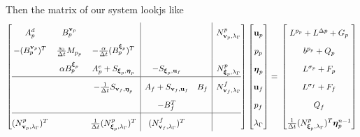\documentclass{article}
\newcommand{\mathspace}[1]{\ensuremath{#1}\xspace} %
\newcommand{\dt}{\mathspace{\Delta t}}
\newcommand{\matzero}{}        %
\newcommand{\uf}{\mathspace{\mathbf{u}_f}}
\newcommand{\vf}{\mathspace{\mathbf{v}_f}}
\newcommand{\up}{\mathspace{\mathbf{u}_p}}
\newcommand{\vp}{\mathspace{\mathbf{v}_p}}
\newcommand{\pf}{\mathspace{p_f}}
\newcommand{\pp}{\mathspace{p_p}}
\newcommand{\wf}{\mathspace{w_f}}
\renewcommand{\wp}{\mathspace{w_p}}
\newcommand{\disp}{\mathspace{\boldsymbol{\eta}_p}}
\newcommand{\disptest}{\mathspace{\boldsymbol{\xi}_p}}
\newcommand{\mult}{\mathspace{\lambda_{\Gamma}}}
\newcommand{\multtest}{\mathspace{\mu_{\Gamma}}}
\begin{document}
Then the matrix of our system lookjs like
\[ \renewcommand{\arraystretch}{1.8}
  \left[\begin{array}{@{}ccc|cc|c@{}}
          
          A^d_p & B^{\vp}_p & \matzero & \matzero & \matzero & N^p_{\vp, \mult} \\ %
          - (B^{\vp}_p)^T & \frac {s_0}{\dt} M_{\pp} & - \frac{\alpha}{\dt} (B^{\disptest}_p)^T & \matzero & \matzero & \matzero\\ %
          \matzero & \alpha B^{\disptest}_p & A^e_p + S_{\disptest, \disp} & - S_{\disptest, \uf} & \matzero & N^p_{\disptest, \mult}\\ %
          \hline
          \matzero & \matzero & - \frac 1 {\dt} S_{\vf, \disp} & A_f + S_{\vf, \uf} & B_f & N^f_{\vf, \mult}\\ %
          \matzero & \matzero & \matzero & -B_f^T & \matzero & \matzero \\ %
          \hline
          (N^p_{\vp, \mult})^T & \matzero & \frac 1 {\dt} (N^p_{\disptest, \mult})^T & (N^f_{\vf, \mult})^T & \matzero & \matzero \\ %

        \end{array}\right]
      \left[\begin{array}{@{}c@{}}
                \up \\
                \pp \\
                \disp \\
                \uf \\
                \pf \\
                \mult
            \end{array}\right]
          = \newline
                      \left[\begin{array}{@{}c@{}}
                L^{\pp} + L^{\Delta p} + G_p\\
                              b^{\pp} + Q_p \\
                L^{\sigma_p} + F_p\\
                L^{\sigma_f} + F_f\\
                Q_f \\
                \frac 1 {\dt} (N^p_{\disptest, \mult})^T \disp^{n-1} \\
        \end{array}\right]
    \]
\end{document}
